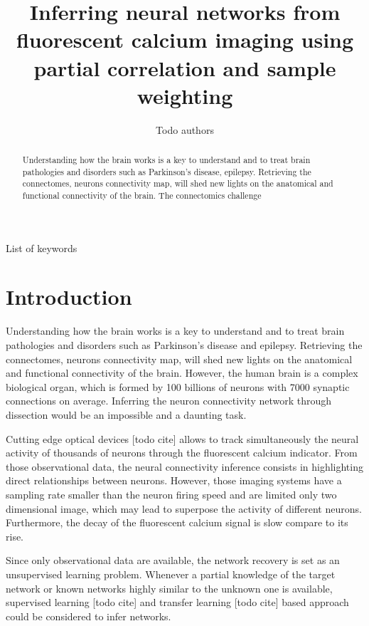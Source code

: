 \documentclass[wcp]{jmlr}
\title[Connectomics challenge]{Inferring neural networks from fluorescent
                               calcium imaging using partial correlation and
                               sample weighting}
\author{Todo authors}
\begin{document}
\maketitle


\begin{abstract}
Understanding how the brain works is a key to understand and to treat
brain pathologies and disorders such as Parkinson's disease, epilepsy.
Retrieving the connectomes, neurons connectivity map, will shed new lights on
the anatomical and functional connectivity of the brain.
The connectomics challenge

\end{abstract}

\begin{keywords}
List of keywords
\end{keywords}


\section{Introduction}\label{sec:intro}

Understanding how the brain works is a key to understand and to treat
brain pathologies and disorders such as Parkinson's disease and epilepsy.
Retrieving the connectomes, neurons connectivity map, will shed new lights on
the anatomical and functional connectivity of the brain. However,
the human brain is a complex biological organ, which is formed by 100
billions of neurons with 7000 synaptic connections on average. Inferring the
neuron connectivity network through dissection would be an impossible
and a daunting task.

Cutting edge optical devices [todo cite] allows to track simultaneously
the neural activity of thousands of neurons through the fluorescent
calcium indicator.
From those observational data, the neural connectivity inference consists in
highlighting direct relationships between neurons. However, those imaging
systems have a sampling rate smaller than the neuron firing speed and are
limited only two dimensional image, which may lead to superpose the activity
of different neurons. Furthermore, the decay of the fluorescent calcium signal
is slow compare to its rise.

Since only observational data are available, the network recovery is set as an
unsupervised learning problem. Whenever a partial knowledge of the target
network or known networks highly similar to the unknown one is available,
supervised learning [todo cite] and transfer learning  [todo cite] based
approach could be considered to infer networks.
\end{document}
